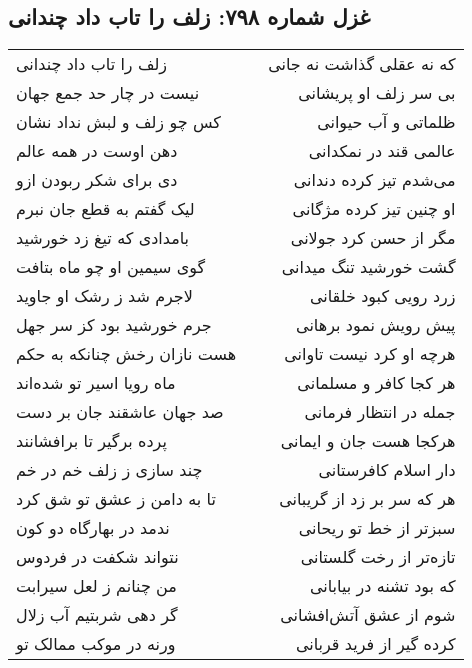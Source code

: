 \begin{center}
\section*{غزل شماره ۷۹۸: زلف را تاب داد چندانی}
\label{sec:798}
\begin{longtable}{l p{0.5cm} r}
زلف را تاب داد چندانی
&&
که نه عقلی گذاشت نه جانی
\\
نیست در چار حد جمع جهان
&&
بی سر زلف او پریشانی
\\
کس چو زلف و لبش نداد نشان
&&
ظلماتی و آب حیوانی
\\
دهن اوست در همه عالم
&&
عالمی قند در نمکدانی
\\
دی برای شکر ربودن ازو
&&
می‌شدم تیز کرده دندانی
\\
لیک گفتم به قطع جان نبرم
&&
او چنین تیز کرده مژگانی
\\
بامدادی که تیغ زد خورشید
&&
مگر از حسن کرد جولانی
\\
گوی سیمین او چو ماه بتافت
&&
گشت خورشید تنگ میدانی
\\
لاجرم شد ز رشک او جاوید
&&
زرد رویی کبود خلقانی
\\
جرم خورشید بود کز سر جهل
&&
پیش رویش نمود برهانی
\\
هست نازان رخش چنانکه به حکم
&&
هرچه او کرد نیست تاوانی
\\
ماه رویا اسیر تو شده‌اند
&&
هر کجا کافر و مسلمانی
\\
صد جهان عاشقند جان بر دست
&&
جمله در انتظار فرمانی
\\
پرده برگیر تا برافشانند
&&
هرکجا هست جان و ایمانی
\\
چند سازی ز زلف خم در خم
&&
دار اسلام کافرستانی
\\
تا به دامن ز عشق تو شق کرد
&&
هر که سر بر زد از گریبانی
\\
ندمد در بهارگاه دو کون
&&
سبزتر از خط تو ریحانی
\\
نتواند شکفت در فردوس
&&
تازه‌تر از رخت گلستانی
\\
من چنانم ز لعل سیرابت
&&
که بود تشنه در بیابانی
\\
گر دهی شربتیم آب زلال
&&
شوم از عشق آتش‌افشانی
\\
ورنه در موکب ممالک تو
&&
کرده گیر از فرید قربانی
\\
\end{longtable}
\end{center}
